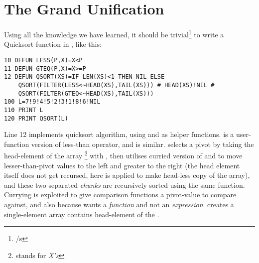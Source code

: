 \section[Wrapping-Up]{The Grand Unification}

Using all the knowledge we have learned, it should be trivial\footnote{/s} to write a Quicksort function in \tbas, like this:

\begin{lstlisting}
10 DEFUN LESS(P,X)=X<P
11 DEFUN GTEQ(P,X)=X>=P
12 DEFUN QSORT(XS)=IF LEN(XS)<1 THEN NIL ELSE 
    QSORT(FILTER(LESS<~HEAD(XS),TAIL(XS))) # HEAD(XS)!NIL # 
    QSORT(FILTER(GTEQ<~HEAD(XS),TAIL(XS)))
100 L=7!9!4!5!2!3!1!8!6!NIL
110 PRINT L
120 PRINT QSORT(L)
\end{lstlisting}

Line 12 implements quicksort algorithm, using  and  as helper functions.  is a user-function version of less-than operator, and  is similar.  selects a pivot by taking the head-element of the array \footnote{stands for \emph{X's}} with , then utilises curried version of  and  to move lesser-than-pivot values to the left and greater to the right (the head element itself does not get recursed, here  is applied to make head-less copy of the array), and these two separated \emph{chunks} are recursively sorted using the same  function. Currying is exploited to give comparison functions a pivot-value to compare against, and also because  wants a \emph{function} and not an \emph{expression}.  creates a single-element array contains head-element of the .

